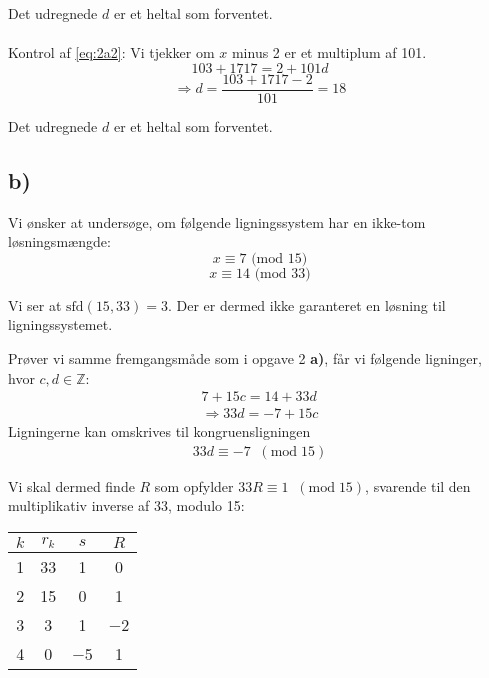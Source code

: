 Det udregnede $d$ er et heltal som forventet.\\
\\
Kontrol af \eqref{eq:2a2}: Vi tjekker om $x$ minus 2 er et multiplum af 101.
\begin{equation}
103 + 1717 = 2 + 101d
\end{equation}
\begin{equation}
\Rightarrow d = \frac{103+1717-2}{101} = 18
\end{equation}

Det udregnede $d$ er et heltal som forventet.

\subsection*{b)}
Vi ønsker at undersøge, om følgende ligningssystem har en ikke-tom løsningsmængde:
\begin{equation}\label{eq:A}
x \equiv 7 \text{ (mod 15)}
\end{equation}
\vspace{-0.55cm}
\begin{equation}\label{eq:B}
x \equiv 14 \text{  (mod 33)}    
\end{equation}

Vi ser at $\text{sfd}(15, 33) = 3$. Der er dermed ikke garanteret en løsning til ligningssystemet.

Prøver vi samme fremgangsmåde som i opgave 2 \textbf{a)}, får vi følgende ligninger, hvor $c,d \in \mathds{Z}$:
\begin{gather*}
    7 + 15c = 14 + 33d  \\
    \Rightarrow 33d = -7 + 15c
\end{gather*}
Ligningerne kan omskrives til kongruensligningen
\begin{gather*}
    33 d \equiv -7 \; \; (\text{mod} \; 15)
\end{gather*}

Vi skal dermed finde $R$ som opfylder $33R \equiv 1 \; \; (\text{mod} \; 15)$, svarende til den multiplikativ inverse af 33, modulo 15:

\begin{table}[H]
    \centering
    \begin{tabular}{c|c|c|c}
    $k$ & $r_k$ & $s$  & $R$  \\ \hline
    1& 33   & 1  & 0  \\
    2& 15   & 0 & 1  \\
    3& 3   & 1  & $-$2 \\
    4& 0    & $-$5 & 1
    \end{tabular}
\end{table}

